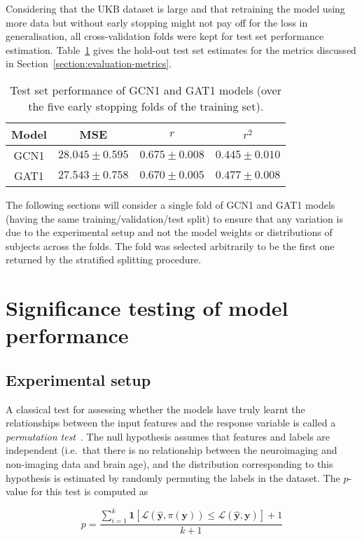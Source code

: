 Considering that the UKB dataset is large and that retraining the model using more data but without early stopping might not pay off for the loss in generalisation, all cross-validation folds were kept for test set performance estimation. Table~\ref{table:test-performance} gives the hold-out test set estimates for the metrics discussed in Section~\ref{section:evaluation-metrics}.

\begin{table}[h]
    \caption{Test set performance of GCN1 and GAT1 models (over the five early stopping folds of the training set).}\label{table:test-performance}
    \centering
    \small
    \begin{tabular}{cccc}
        \hline
    \textbf{Model} & MSE & $r$ & $r^2$ \\  \hline
        GCN1 & $28.045 \pm 0.595$ & $0.675 \pm 0.008$ & $0.445 \pm 0.010$ \\
        GAT1 & $27.543 \pm 0.758$ & $0.670 \pm 0.005$ & $0.477 \pm 0.008$ \\ \hline
\end{tabular}
\end{table}

The following sections will consider a single fold of GCN1 and GAT1 models (having the same training/validation/test split) to ensure that any variation is due to the experimental setup and not the model weights or distributions of subjects across the folds. The fold was selected arbitrarily to be the first one returned by the stratified splitting procedure.

\section{Significance testing of model performance}
\subsection{Experimental setup}
A classical test for assessing whether the models have truly learnt the relationships between the input features and the response variable is called a \textit{permutation test}~\cite{ojala2010permutation}. The null hypothesis assumes that features and labels are independent (i.e.\ that there is no relationship between the neuroimaging and non-imaging data and brain age), and the distribution corresponding to this hypothesis is estimated by randomly permuting the labels in the dataset. The $p$-value for this test is computed as

\begin{equation}
    p = \frac{\sum_{i=1}^k \mathbf{1}\left[\mathcal{L}(\mathbf{\hat{y}}, \pi(\mathbf{y})) \leq \mathcal{L}(\mathbf{\hat{y}}, \mathbf{y})\right] + 1}{k+1}\label{eq:p-value}
\end{equation}

